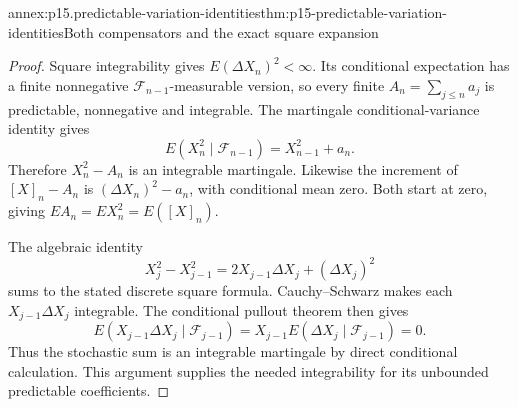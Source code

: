 \begin{annexitem}{annex:p15.predictable-variation-identities}{thm:p15-predictable-variation-identities}{Both compensators and the exact square expansion}
\begin{proof}
Square integrability gives \(E(\Delta X_n)^2<\infty\).
Its conditional expectation has a finite nonnegative
\(\mathcal F_{n-1}\)-measurable version, so every finite
\(A_n=\sum_{j\leq n}a_j\) is predictable, nonnegative and integrable.
The martingale conditional-variance identity gives
\[
                     E(X_n^2\mid\mathcal F_{n-1})
                                           =X_{n-1}^2+a_n.
\]
Therefore \(X_n^2-A_n\) is an integrable martingale.
Likewise the increment of \([X]_n-A_n\) is
\((\Delta X_n)^2-a_n\), with conditional mean zero.
Both start at zero, giving \(EA_n=EX_n^2=E([X]_n)\).

The algebraic identity
\[
           X_j^2-X_{j-1}^2
                     =2X_{j-1}\Delta X_j+(\Delta X_j)^2
\]
sums to the stated discrete square formula.
Cauchy--Schwarz makes each \(X_{j-1}\Delta X_j\) integrable.
The conditional pullout theorem then gives
\[
 E(X_{j-1}\Delta X_j\mid\mathcal F_{j-1})
                              =X_{j-1}E(\Delta X_j\mid\mathcal F_{j-1})=0.
\]
Thus the stochastic sum is an integrable martingale by direct
conditional calculation. This argument supplies the needed
integrability for its unbounded predictable coefficients.
\end{proof}
\end{annexitem}

